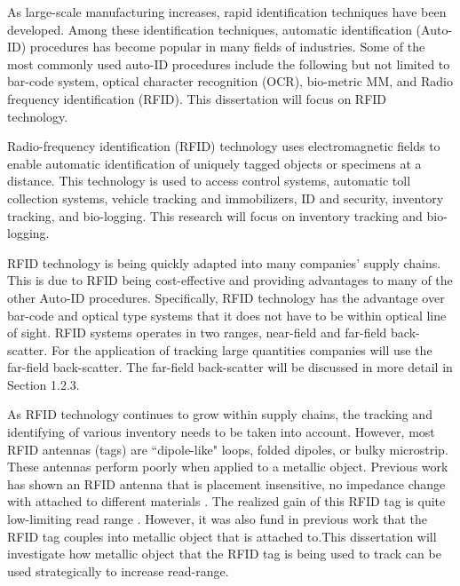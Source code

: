   
As large-scale manufacturing increases, rapid identification techniques have been developed. Among these identification techniques, automatic identification (Auto-ID) procedures  has become popular in many fields of industries. Some of the most commonly used auto-ID procedures include the following but not limited to bar-code system, optical character recognition (OCR), bio-metric MM, and Radio frequency identification (RFID). This dissertation will focus on RFID technology.   

Radio-frequency identification (RFID) technology uses electromagnetic fields to enable automatic identification of uniquely tagged objects or specimens at a distance. This technology is used to access control systems, automatic toll collection systems, vehicle tracking and immobilizers, ID and security, inventory tracking, and bio-logging. This research will focus on inventory tracking and bio-logging.

RFID technology is being quickly adapted into many companies' supply chains. This is due to RFID being cost-effective and providing advantages to many of the other Auto-ID procedures. Specifically, RFID technology has the advantage over bar-code and optical type systems that it does not have to be within optical line of sight.  
RFID systems operates in two ranges, near-field and far-field back-scatter. For the application of tracking large quantities companies will use the far-field back-scatter. The far-field back-scatter will be discussed in more detail in Section 1.2.3.  

As RFID technology continues to grow within supply chains, the tracking and identifying of various inventory needs to be taken into account. However, most RFID antennas (tags) are ``dipole-like" loops, folded dipoles, or bulky microstrip. These antennas perform poorly when applied to a metallic object. Previous work has shown an RFID antenna that is placement insensitive, no impedance change with attached to different materials \cite{ruyle2012small} \cite{ruyle2016placement}. The realized gain of this RFID tag is quite low-limiting read range \cite{ruyle2016placement}. However, it was also fund in previous work that the RFID tag couples into metallic object that is attached to\cite{moreno2016RzGain}.This dissertation will investigate how metallic object that the RFID tag is being used to track can be used strategically to increase read-range. 

